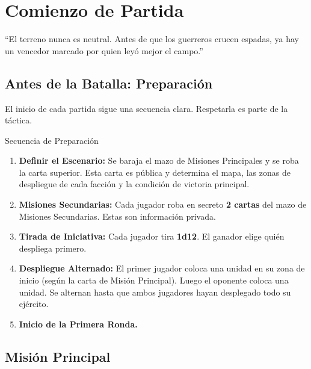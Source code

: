
\chapter{Comienzo de Partida}

\begin{loreblock}
``El terreno nunca es neutral. Antes de que los guerreros crucen espadas, ya hay un vencedor marcado por quien leyó mejor el campo.''
\end{loreblock}

\vspace{0.4cm}

\section{Antes de la Batalla: Preparación}

El inicio de cada partida sigue una secuencia clara. Respetarla es parte de la táctica.

\begin{reglaespecial}{Secuencia de Preparación}
\begin{enumerate}
    \item \textbf{Definir el Escenario:} Se baraja el mazo de Misiones Principales y se roba la carta superior. Esta carta es pública y determina el mapa, las zonas de despliegue de cada facción y la condición de victoria principal.
    \item \textbf{Misiones Secundarias:} Cada jugador roba en secreto \textbf{2 cartas} del mazo de Misiones Secundarias. Estas son información privada.
    \item \textbf{Tirada de Iniciativa:} Cada jugador tira \textbf{1d12}. El ganador elige quién despliega primero.
    \item \textbf{Despliegue Alternado:} El primer jugador coloca una unidad en su zona de inicio (según la carta de Misión Principal). Luego el oponente coloca una unidad. Se alternan hasta que ambos jugadores hayan desplegado todo su ejército.
    \item \textbf{Inicio de la Primera Ronda.}
\end{enumerate}
\end{reglaespecial}

\section{Misión Principal}

